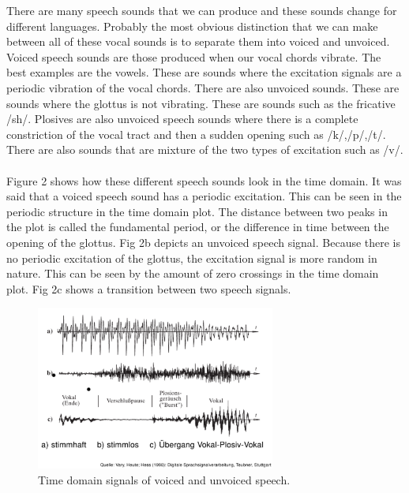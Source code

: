 There are many speech sounds that we can produce and these sounds change for different languages. Probably the most obvious distinction that we can make between all of these vocal sounds is to separate them into voiced and unvoiced. Voiced speech sounds are those produced when our vocal chords vibrate. The best examples are the vowels.  These are sounds where the excitation signals are a periodic vibration of the vocal chords.  There are also unvoiced sounds. These are sounds where the glottus is not vibrating.  These are sounds such as the fricative  /sh/.  Plosives are also unvoiced speech sounds where there is a  complete constriction of the vocal tract and then a sudden opening such as /k/,/p/,/t/.  There are also sounds that are mixture of the two types of excitation such as /v/. \\
\\
Figure 2 shows how these different speech sounds look in the time domain. It was said that a voiced speech sound has a periodic excitation.  This can be seen in the periodic structure in the time domain plot.  The distance between two peaks in the plot is called the fundamental period, or the difference in time between the opening of the glottus. Fig 2b depicts an unvoiced speech signal.  Because there is no periodic excitation of the glottus, the excitation signal is more random in nature. This can be seen by the amount of zero crossings in the time domain plot.  Fig 2c shows a transition between two speech signals.\\

\begin{figure}
    \includegraphics[width=0.7\textwidth]{Pictures/Chapter1_Lesson2/sprachlaute-eps-converted-to.pdf}
    \caption{Time domain signals of voiced and unvoiced speech.}
\end{figure}

